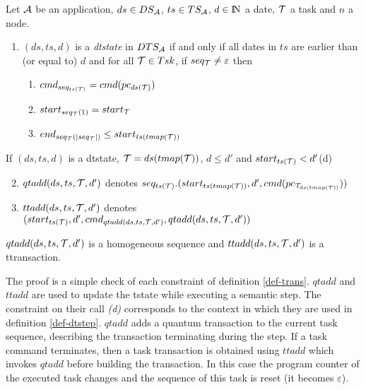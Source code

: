 \documentclass{article}
\newcommand{\NAT}{\mbox{\normalfont I$\!$N}}
\begin{document}
\begin{definition}\label{def-dtst} Let ${\cal A}$ be an application, $ds\in DS_{\cal A}$, $ts\in TS_{\cal A}$, $d\in\NAT$ a date, ${\cal T}$ a task and $n$ a node.
\begin{enumerate}
\item $(ds,ts,d)$ is a {\em dtstate} in $DTS_{\cal A}$ if and only if all dates in $ts$ are earlier than (or equal to) $d$ and for all ${\cal T}\in Tsk$, if $seq_{\cal T}\neq \varepsilon$ then 
   \begin{enumerate}
	 \item $cmd_{seq_{ts({\cal T})}}=cmd(pc_{ds({\cal T})})$
	 \item $start_{seq_{\cal T}(1)}=start_{\cal T}$
	 \item $end_{seq_{\cal T}(|seq_{\cal T}|)}\leq start_{ts(tmap({\cal T}))}$
	 \end{enumerate}
\end{enumerate}
If $(ds,ts,d)$ is a dtstate, ${\cal T}=ds(tmap({\cal T}))$, $d\leq d'$ and $start_{ts({\cal T})}< d'$\hspace{2cm}(d)
\begin{enumerate}\setcounter{enumi}{1}
\item $qtadd (ds,ts,{\cal T},d')$ denotes $seq_{ts({\cal T})}.(start_{ts(tmap({\cal T}))},d',cmd(pc_{{\cal T}_{ds(tmap({\cal T}))}}))$
\item $ttadd(ds,ts,{\cal T},d')$ denotes $(start_{ts({\cal T})},d',cmd_{qtadd (ds,ts,{\cal T},d')},qtadd (ds,ts,{\cal T},d'))$
\end{enumerate}
\end{definition}
\begin{fact}\label{fact-upd}
$qtadd (ds,ts,{\cal T},d')$ is a homogeneous sequence and $ttadd(ds,ts,{\cal T},d')$ is a ttransaction.
\end{fact}
The proof is a simple check of each constraint of definition \ref{def-trans}. $qtadd$ and $ttadd$ are used to update the tstate while executing a semantic step. The constraint on their call {\em (d)} corresponds to the context in which they are used in definition \ref{def-dtstep}. $qtadd$ adds a quantum transaction to the current task sequence, describing the transaction terminating during the step. If a task command terminates, then a task transaction is obtained using $ttadd$ which invokes $qtadd$ before building the transaction. In this case the program counter of the executed task changes and the sequence of this task is reset (it becomes $\varepsilon$).
\end{document}
